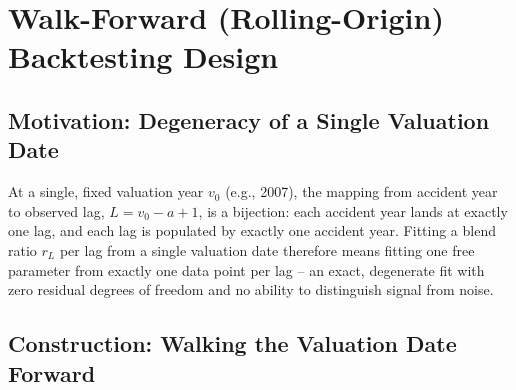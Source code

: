 \documentclass[11pt]{article}
\begin{document}
\section{Walk-Forward (Rolling-Origin) Backtesting Design}
\label{sec:walkforward}

\subsection{Motivation: Degeneracy of a Single Valuation Date}

At a single, fixed valuation year $v_0$ (e.g., 2007), the mapping from accident year to observed
lag, $L = v_0 - a + 1$, is a bijection: each accident year lands at exactly one lag, and each lag
is populated by exactly one accident year. Fitting a blend ratio $r_L$ per lag from a single
valuation date therefore means fitting one free parameter from exactly one data point per lag --
an exact, degenerate fit with zero residual degrees of freedom and no ability to distinguish
signal from noise.

\subsection{Construction: Walking the Valuation Date Forward}
\end{document}
